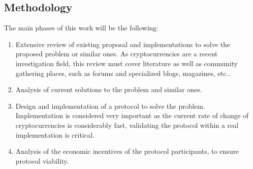 \begin{intro}
\section{Methodology}
The main phases of this work will be the following:
\begin{enumerate}
	\item Extensive review of existing proposal and implementations to solve
	  the proposed problem or similar ones. As cryptocurrencies are a recent
	  investigation field, this review must cover literature as well as
	  community gathering places, such as forums and specialized blogs, magazines,
	  etc.. 
  \item Analysis of current solutions to the problem and similar ones.
  \item Design and implementation of a protocol to solve the problem.
    Implementation is considered very important as the current rate of change
    of cryptocurrencies is considerably fast, validating the protocol within a
    real implementation is critical.
  \item Analysis of the economic incentives of the protocol participants, to
    ensure protocol viability.
\end{enumerate}
\end{intro}
